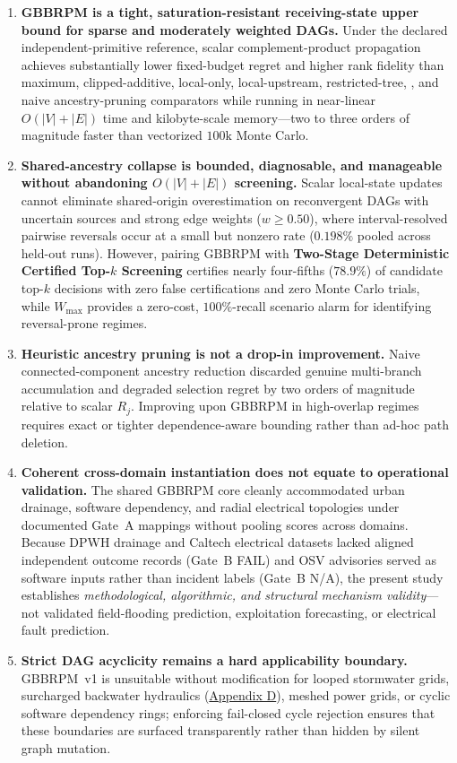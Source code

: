 \begin{enumerate}[label=\arabic*.,leftmargin=*]
\item \textbf{GBBRPM is a tight, saturation-resistant receiving-state
upper bound for sparse and moderately weighted DAGs.} Under the
declared independent-primitive reference, scalar complement-product
propagation achieves substantially lower fixed-budget regret and higher
rank fidelity than maximum, clipped-additive, local-only, local-upstream,
restricted-tree, \citet{abbe2020}, and naive ancestry-pruning
comparators while running in near-linear $O(|V|+|E|)$ time and
kilobyte-scale memory---two to three orders of magnitude faster than
vectorized $100\text{k}$ Monte Carlo.
\item \textbf{Shared-ancestry collapse is bounded, diagnosable, and
manageable without abandoning $O(|V|+|E|)$ screening.} Scalar local-state
updates cannot eliminate shared-origin overestimation on reconvergent
DAGs with uncertain sources and strong edge weights ($w \ge 0.50$),
where interval-resolved pairwise reversals occur at a small but nonzero
rate ($0.198\%$ pooled across held-out runs). However, pairing GBBRPM
with \textbf{Two-Stage Deterministic Certified Top-$k$ Screening}
certifies nearly four-fifths ($78.9\%$) of candidate top-$k$ decisions
with zero false certifications and zero Monte Carlo trials, while
$W_{\max}$ provides a zero-cost, $100\%$-recall scenario alarm for
identifying reversal-prone regimes.
\item \textbf{Heuristic ancestry pruning is not a drop-in improvement.}
Naive connected-component ancestry reduction discarded genuine
multi-branch accumulation and degraded selection regret by two orders
of magnitude relative to scalar $R_j$. Improving upon GBBRPM in
high-overlap regimes requires exact or tighter dependence-aware
bounding rather than ad-hoc path deletion.
\item \textbf{Coherent cross-domain instantiation does not equate to
operational validation.} The shared GBBRPM core cleanly accommodated
urban drainage, software dependency, and radial electrical topologies
under documented Gate~A mappings without pooling scores across domains.
Because DPWH drainage and Caltech electrical datasets lacked aligned
independent outcome records (Gate~B FAIL) and OSV advisories served as
software inputs rather than incident labels (Gate~B N/A), the present
study establishes \emph{methodological, algorithmic, and structural
mechanism validity}---not validated field-flooding prediction,
exploitation forecasting, or electrical fault prediction.
\item \textbf{Strict DAG acyclicity remains a hard applicability
boundary.} GBBRPM~v1 is unsuitable without modification for looped
stormwater grids, surcharged backwater hydraulics
(\hyperref[app:preliminary]{Appendix D}), meshed power grids, or cyclic
software dependency rings; enforcing fail-closed cycle rejection ensures
that these boundaries are surfaced transparently rather than hidden by
silent graph mutation.
\end{enumerate}
